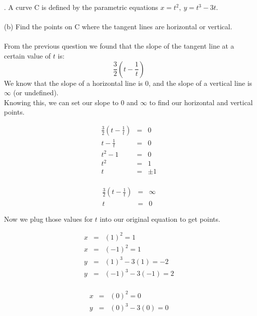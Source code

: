 \documentclass[11pt]{exam}
\begin{document}
. A curve C is defined by the parametric equations $x=t^2,\ y=t^3-3t$. \\
\\
\indent (b) Find the points on C where the tangent lines are horizontal or vertical.
\\\\
From the previous question we found that the slope of the tangent line at a certain value of $t$ is:\\
$$\frac{3}{2}\left(t-\frac{1}{t}\right)$$
We know that the slope of a horizontal line is 0, and the slope of a vertical line is $\infty$ (or undefined).\\
Knowing this, we can set our slope to 0 and $\infty$ to find our horizontal and vertical points.\\
\noindent
\begin{minipage}{.5\linewidth}
	\begin{eqnarray*}
		\frac{3}{2}\left(t-\frac{1}{t}\right) &=& 0 \\
		t - \frac{1}{t} &=& 0 \\
		t^2 - 1 &=& 0 \\
		t^2 &=& 1 \\
		t &=& \pm 1 \\
	\end{eqnarray*}
\end{minipage}
\begin{minipage}{.5\linewidth}
	\begin{eqnarray*}
		\frac{3}{2}\left(t-\frac{1}{t}\right) &=& \infty \\
		t &=& 0
	\end{eqnarray*}
\end{minipage}
Now we plug those values for $t$ into our original equation to get points.\\
\noindent
\begin{minipage}{.5\linewidth}
	\begin{eqnarray*}	
		x &=& (1)^2 = 1 \\
		x &=& (-1)^2 = 1 \\
		y &=& (1)^3 - 3(1) = -2\\
		y &=& (-1)^3 - 3(-1) = 2\\
	\end{eqnarray*}
\end{minipage}
\begin{minipage}{.5\linewidth}
	\begin{eqnarray*}
		x &=& (0)^2 = 0 \\
		y &=& (0)^3-3(0) = 0 \\
	\end{eqnarray*}
\end{minipage}
\end{document}
